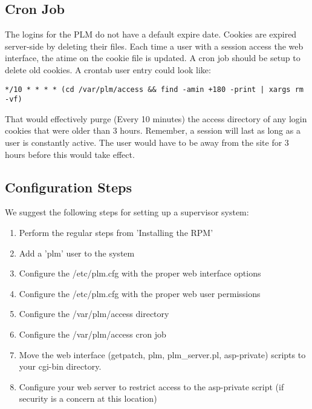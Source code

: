 \subsection{Cron Job}
The logins for the PLM do not have a default expire date.  Cookies are expired server-side by deleting their files.  Each time a user with a session access the web interface, the atime on the cookie file is updated.  A cron job should be setup to delete old cookies.  A crontab user entry could look like:

\begin{verbatim}
*/10 * * * * (cd /var/plm/access && find -amin +180 -print | xargs rm -vf)
\end{verbatim}

That would effectively purge (Every 10 minutes) the access directory of any login cookies that were older than 3 hours.  Remember, a session will last as long as a user is constantly active.  The user would have to be away from the site for 3 hours before this would take effect.

\subsection{Configuration Steps}
We suggest the following steps for setting up a supervisor system:
\begin{enumerate}
\item Perform the regular steps from 'Installing the RPM'
\item Add a 'plm' user to the system
\item Configure the /etc/plm.cfg with the proper web interface options
\item Configure the /etc/plm.cfg with the proper web user permissions
\item Configure the /var/plm/access directory
\item Configure the /var/plm/access cron job
\item Move the web interface (getpatch, plm, plm\_server.pl, asp-private) scripts to your cgi-bin directory.
\item Configure your web server to restrict access to the asp-private script (if security is a concern at this location)
\end{enumerate}
